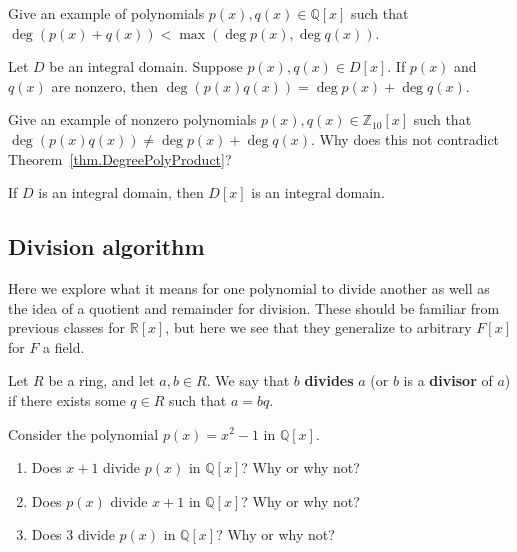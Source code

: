 \begin{problem}
Give an example of polynomials $p(x),q(x)\in \mathbb{Q}[x]$ such that $\deg(p(x)+q(x)) < \max(\deg p(x),\deg q(x))$.
\end{problem}

\begin{theorem}\label{thm.DegreePolyProduct}
Let $D$ be an integral domain. Suppose $p(x),q(x) \in D[x]$. If $p(x)$ and $q(x)$ are nonzero, then $\deg(p(x)q(x)) = \deg p(x) + \deg q(x)$.
\end{theorem}

\begin{problem}
Give an example of nonzero polynomials $p(x),q(x)\in \mathbb{Z}_{10}[x]$ such that $\deg(p(x)q(x)) \neq \deg p(x) + \deg q(x)$. Why does this not contradict Theorem~\ref{thm.DegreePolyProduct}?
\end{problem}

\begin{corollary}\label{cor.PolysOverIntegralDomains}
If $D$ is an integral domain, then $D[x]$ is an integral domain.
\end{corollary}

\subsection{Division algorithm}
Here we explore what it means for one polynomial to divide another as well as the idea of a quotient and remainder for division. These should be familiar from previous classes for $\mathbb{R}[x]$, but here we see that they generalize to arbitrary $F[x]$ for $F$ a field.
 
\begin{definition}
Let $R$ be a ring, and let $a,b\in R$. We say that $b$ \textbf{divides} $a$ (or $b$ is a \textbf{divisor} of $a$) if there exists some $q\in R$ such that $a = bq$.
\end{definition}

\begin{problem}
Consider the polynomial $p(x) = x^2 - 1$ in $\mathbb{Q}[x]$.
\begin{enumerate}
\item Does $x+1$ divide $p(x)$ in $\mathbb{Q}[x]$? Why or why not?
\item Does $p(x)$ divide $x+1$ in $\mathbb{Q}[x]$? Why or why not?
\item Does $3$ divide $p(x)$ in $\mathbb{Q}[x]$? Why or why not?
\end{enumerate}
\end{problem}

